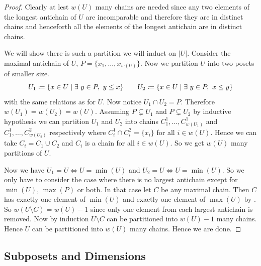 \documentclass[twoside]{article}
\begin{document}
\begin{proof}
	Clearly at lest $w(U)$ many chains are needed since any two elements of the longest antichain of $U$ are incomparable and therefore they are in distinct chains and henceforth all the elements of the longest antichain are in distinct chains.
	
	We will show there is such a partition we will induct on $|U|$. Consider the maximal antichain of $U$, $P=\{x_1,\dots, x_{w(U)}\}$. Now we partition $U$ into two posets of smaller size.$$U_1\coloneqq \{x\in U\mid \exists\ y\in P,\ y\leq x\}\qquad U_2\coloneqq \{x\in U\mid \exists\ y\in P,\ x\leq y\}$$ with the same relations as for $U$. Now notice $U_1\cap U_2=P$. Therefore $w(U_1)=w(U_2)=w(U)$. Assuming $P\subsetneq U_1$ and $P\subsetneq U_2$ by inductive hypothesis we can partition $U_1$ and $U_2$ into chains $C^1_1,\dots, C_{w(U_1)}^1$ and $C_1^1,\dots, C_{w(U_2)}^2$ respectively where $C_i^1\cap C_i^2=\{x_i\}$ for all $i\in w(U)$. Hence we can take $C_i=C_1\cup C_2$ and $C_i$ is a chain for all $i\in w(U)$. So we get $w(U)$ many partitions of $U$.
	
	Now we have $U_1=U\iff U=\min(U)$ and $U_2=U\iff U=\min(U)$. So we only have to consider the case where  there is no largest antichain except for $\min(U )$, $\max(P )$ or both.  In that case let $C$ be any maximal chain. Then $C$ has exactly one element of $\min(U)$ and exactly one element of $\max(U)$ by . So $w(U\setminus C)=w(U)-1$ since only one element from each largest antichain is removed. Now by induction $U\setminus C$ can be partitioned into $w(U)-1$ many chains. Hence $U$ can be partitioned into $w(U)$ many chains. Hence we are done. 
\end{proof}
\subsection{Subposets and Dimensions}
\end{document}
